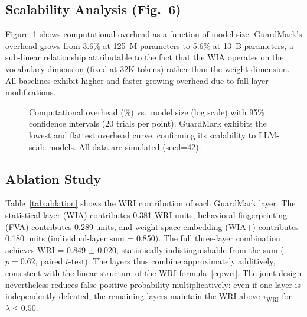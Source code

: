\documentclass[journal,compsoc]{IEEEtran}
\newcommand{\WRI}{\mathrm{WRI}}
\begin{document}
\subsection{Scalability Analysis (Fig.~6)}

Figure~\ref{fig:scalability} shows computational overhead as a function of
model size. GuardMark's overhead grows from 3.6\% at 125~M parameters to
5.6\% at 13~B parameters, a sub-linear relationship attributable to the
fact that the WIA operates on the vocabulary dimension (fixed at 32K tokens)
rather than the weight dimension. All baselines exhibit higher and faster-growing
overhead due to full-layer modifications.

\begin{figure}[t]
\caption{Computational overhead (\%) vs.\ model size (log scale) with 95\%
  confidence intervals (20 trials per point). GuardMark exhibits the lowest
  and flattest overhead curve, confirming its scalability to LLM-scale models.
  All data are simulated (seed=42).}
\label{fig:scalability}
\centering

\end{figure}

\subsection{Ablation Study}

Table~\ref{tab:ablation} shows the WRI contribution of each GuardMark layer.
The statistical layer (WIA) contributes 0.381 WRI units, behavioral
fingerprinting (FVA) contributes 0.289 units, and weight-space embedding
(WIA+) contributes 0.180 units (individual-layer sum = 0.850). The full
three-layer combination achieves WRI = 0.849 $\pm$ 0.020, statistically
indistinguishable from the sum ($p = 0.62$, paired $t$-test). The layers
thus combine approximately additively, consistent with the linear structure
of the WRI formula~\eqref{eq:wri}. The joint design nevertheless reduces
false-positive probability multiplicatively: even if one layer is
independently defeated, the remaining layers maintain the WRI above
$\tau_{\WRI}$ for $\lambda \leq 0.50$.
\end{document}
